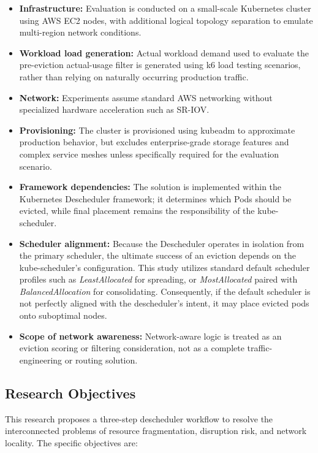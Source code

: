 \begin{itemize}
    \item \textbf{Infrastructure:} Evaluation is conducted on a small-scale Kubernetes cluster using AWS EC2 nodes, with additional logical topology separation to emulate multi-region network conditions.
    \item \textbf{Workload load generation:} Actual workload demand used to evaluate the pre-eviction actual-usage filter is generated using k6 load testing scenarios, rather than relying on naturally occurring production traffic.
    \item \textbf{Network:} Experiments assume standard AWS networking without specialized hardware acceleration such as SR-IOV.
    \item \textbf{Provisioning:} The cluster is provisioned using kubeadm to approximate production behavior, but excludes enterprise-grade storage features and complex service meshes unless specifically required for the evaluation scenario.
    \item \textbf{Framework dependencies:} The solution is implemented within the Kubernetes Descheduler framework; it determines which Pods should be evicted, while final placement remains the responsibility of the kube-scheduler.
    \item \textbf{Scheduler alignment:} Because the Descheduler operates in isolation from the primary scheduler, the ultimate success of an eviction depends on the kube-scheduler's configuration. This study utilizes standard default scheduler profiles such as \textit{LeastAllocated} for spreading, or \textit{MostAllocated} paired with \textit{BalancedAllocation} for consolidating. Consequently, if the default scheduler is not perfectly aligned with the descheduler's intent, it may place evicted pods onto suboptimal nodes.
    \item \textbf{Scope of network awareness:} Network-aware logic is treated as an eviction scoring or filtering consideration, not as a complete traffic-engineering or routing solution.
\end{itemize}

\subsection{Research Objectives}
\label{sec:researchObjectives}

This research proposes a three-step descheduler workflow to resolve the interconnected problems of resource fragmentation, disruption risk, and network locality. The specific objectives are:

